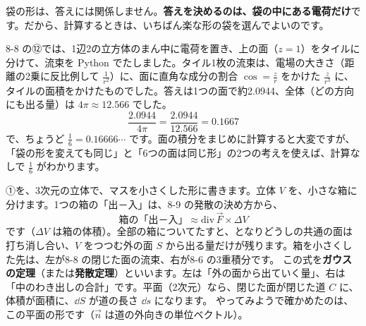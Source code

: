 袋の形は、答えには関係しません。\textbf{答えを決めるのは、袋の中にある電荷だけ}です。だから、計算するときは、いちばん楽な形の袋を選んでよいのです。

8-8 の⑫では、1辺2の立方体のまん中に電荷を置き、上の面（$z=1$）をタイルに分けて、流束を Python でたしました。タイル1枚の流束は、電場の大きさ（距離の2乗に反比例して $\tfrac{1}{r^2}$）に、面に直角な成分の割合 $\cos=\tfrac{z}{r}$ をかけた $\tfrac{z}{r^3}$ に、タイルの面積をかけたものでした。答えは1つの面で約2.0944、全体（どの方向にも出る量）は $4\pi\approx12.566$ でした。
\[ \frac{2.0944}{4\pi}=\frac{2.0944}{12.566}=0.1667 \]
で、ちょうど $\tfrac{1}{6}=0.16666\cdots$ です。面の積分をまじめに計算すると大変ですが、「袋の形を変えても同じ」と「6つの面は同じ形」の2つの考えを使えば、計算なしで $\tfrac{1}{6}$ がわかります。




\leavevmode\label{bk:8-11:gauss}①を、3次元の立体で、マスを小さくした形に書きます。立体 $V$ を、小さな箱に分けます。1つの箱の「出－入」は、8-9 の発散の決め方から、
\[ \text{箱の「出－入」}\approx\mathrm{div}\,\vec F\times\Delta V \]
です（$\Delta V$ は箱の体積）。全部の箱についてたすと、となりどうしの共通の面は打ち消し合い、$V$ をつつむ外の面 $S$ から出る量だけが残ります。箱を小さくした先は、左が8-8 の閉じた面の流束、右が8-6 の3重積分です。
この式を\textbf{ガウスの定理}（または\textbf{発散定理}）といいます。左は「外の面から出ていく量」、右は「中のわき出しの合計」です。平面（2次元）なら、閉じた面が閉じた道 $C$ に、体積が面積に、$\dd S$ が道の長さ $\dd s$ になります。
やってみようで確かめたのは、この平面の形です（$\vec n$ は道の外向きの単位ベクトル）。

